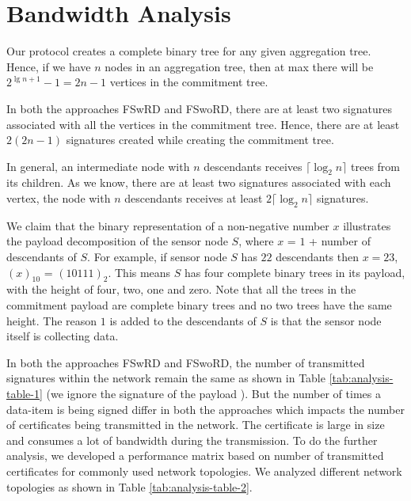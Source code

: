 	\section{Bandwidth Analysis}

		Our protocol creates a complete binary tree for any given aggregation tree.
		Hence, if we have $n$ nodes in an aggregation tree, then at max there will be $2^{\lg n + 1} - 1 = 2n-1$ vertices in the commitment tree.

		In both the approaches FSwRD and FSwoRD, there are at least two signatures associated with all the vertices in the commitment tree.
		Hence, there are at least $2(2n-1)$ signatures created while creating the commitment tree.

		In general, an intermediate node with $n$ descendants receives $\lceil \log_2 n \rceil$ trees from its children.
		As we know, there are at least two signatures associated with each vertex, the node with $n$ descendants receives at least $2 \lceil \log_2 n \rceil $ signatures.

		We claim that the binary representation of a non-negative number $x$ illustrates the payload decomposition of the sensor node $S$, where $x$ = $1$ + number of descendants of $S$.
		For example, if sensor node $S$ has $22$ descendants then $x =23$, $(x)_{10}$ = $(10111)_{2}$. 
		This means $S$ has four complete binary trees in its payload, with the height of four, two, one and zero.
		Note that all the trees in the commitment payload are complete binary trees and no two trees have the same height.
		The reason $1$ is added to the descendants of $S$ is that the sensor node itself is collecting data.

		In both the approaches FSwRD and FSwoRD, the number of transmitted signatures within the network remain the same as shown in Table \ref{tab:analysis-table-1} (we ignore the signature of the payload ). 
		But the number of times a data-item is being signed differ in both the approaches which impacts the number of certificates being transmitted in the network.
		The certificate is large in size and consumes a lot of bandwidth during the transmission.
		To do the further analysis, we developed a performance matrix based on number of transmitted certificates for commonly used network topologies.
		We analyzed different network topologies as shown in Table \ref{tab:analysis-table-2}. 
		
